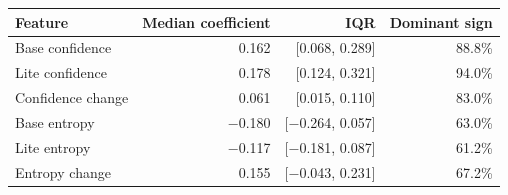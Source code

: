 \begin{tabular}{lrrr}
\toprule
Feature & Median coefficient & IQR & Dominant sign \\
\midrule
Base confidence & 0.162 & [0.068, 0.289] & 88.8\% \\
Lite confidence & 0.178 & [0.124, 0.321] & 94.0\% \\
Confidence change & 0.061 & [0.015, 0.110] & 83.0\% \\
Base entropy & $-$0.180 & [$-$0.264, 0.057] & 63.0\% \\
Lite entropy & $-$0.117 & [$-$0.181, 0.087] & 61.2\% \\
Entropy change & 0.155 & [$-$0.043, 0.231] & 67.2\% \\
\bottomrule
\end{tabular}

